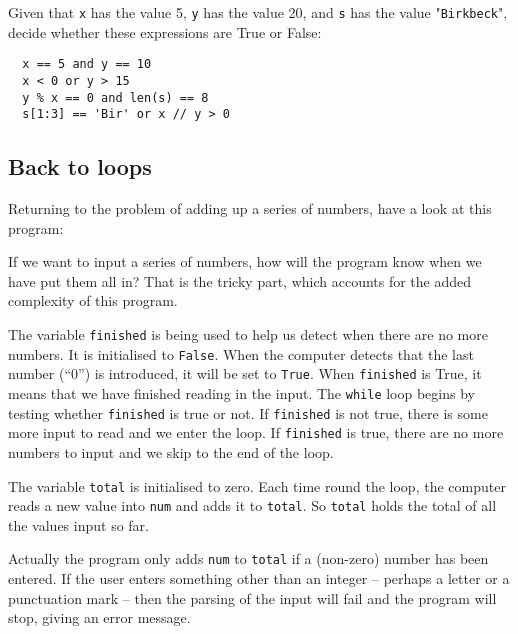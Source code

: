 Given that \texttt{x} has the value 5, \texttt{y} has the value 20,
and \texttt{s} has the value "\texttt{Birkbeck}", decide whether these
expressions are True or False:

\begin{verbatim}
  x == 5 and y == 10
  x < 0 or y > 15
  y % x == 0 and len(s) == 8
  s[1:3] == 'Bir' or x // y > 0
\end{verbatim}


\subsection{Back to loops}
\label{subsec:backtoloops}

Returning to the problem of adding up a series of numbers, have a
look at this program:


If we want to input a series of numbers, how will the program know
when we have put them all in?  That is the tricky part, which accounts
for the added complexity of this program.

The variable
\texttt{finished} is being used to help us detect when there are no more
numbers. It is initialised to \texttt{False}.  When the computer detects
that the last number (``0'') is introduced, it will be set to \texttt{True}.
When \texttt{finished} is True, it means that we have finished reading in
the input. The \texttt{while} loop begins by testing whether \texttt{finished}
is true or not.  If \texttt{finished} is not true, there is some more input
to read and we enter the loop. If \texttt{finished} is true, there are
no more numbers to input and we skip to the end of the loop.

The variable \texttt{total} is initialised to zero.
Each time round the loop, the computer reads a new value into \texttt{num}
and adds it to \texttt{total}. So \texttt{total} holds the total of all
the values input so far.

Actually the program only adds  \texttt{num} to \texttt{total} if a (non-zero) 
number has been entered. 
If the user enters something other than an integer 
-- perhaps a letter or a punctuation mark -- 
then the parsing of the input will fail 
and the program will stop, giving an error message.

